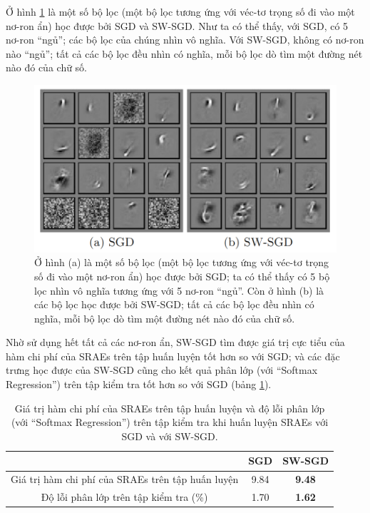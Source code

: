 Ở hình \ref{fig_filters} là một số bộ lọc (một bộ lọc tương ứng với véc-tơ trọng số đi vào một nơ-ron ẩn) học được bởi SGD và SW-SGD. Như ta có thể thấy, với SGD, có 5 nơ-ron ``ngủ''; các bộ lọc của chúng nhìn vô nghĩa. Với SW-SGD, không có nơ-ron nào ``ngủ''; tất cả các bộ lọc đều nhìn có nghĩa, mỗi bộ lọc dò tìm một đường nét nào đó của chữ số.
\begin{figure}
	\centering
	\includegraphics[width=\textwidth]{some_filters}
	\caption[So sánh giữa các bộ lọc học được bởi SGD với SW-SGD]{Ở hình (a) là một số bộ lọc (một bộ lọc tương ứng với véc-tơ trọng số đi vào một nơ-ron ẩn) học được bởi SGD; ta có thể thấy có 5 bộ lọc nhìn vô nghĩa tương ứng với 5 nơ-ron ``ngủ''. Còn ở hình (b) là các bộ lọc học được bởi SW-SGD; tất cả các bộ lọc đều nhìn có nghĩa, mỗi bộ lọc dò tìm một đường nét nào đó của chữ số.}
	\label{fig_filters}
\end{figure}

Nhờ sử dụng hết tất cả các nơ-ron ẩn, SW-SGD tìm được giá trị cực tiểu của hàm chi phí của SRAEs trên tập huấn luyện tốt hơn so với SGD; và các đặc trưng học được của SW-SGD cũng cho kết quả phân lớp (với ``Softmax Regression'') trên tập kiểm tra tốt hơn so với SGD (bảng \ref{table_SGDvsSW-SGD}).

\begin{table}
	\centering
	\caption[So sánh giữa SGD với SW-SGD]{Giá trị hàm chi phí của SRAEs trên tập huấn luyện và độ lỗi phân lớp (với ``Softmax Regression'') trên tập kiểm tra khi huấn luyện SRAEs với SGD và với SW-SGD.}
	\label{table_SGDvsSW-SGD}
	\begin{tabular}{|c|c|c|} \hline
	 & SGD & SW-SGD\\ \hline
	Giá trị hàm chi phí của SRAEs trên tập huấn luyện & 9.84 & \textbf{9.48}\\ \hline 
	Độ lỗi phân lớp trên tập kiểm tra (\%) & 1.70 & \textbf{1.62}\\ \hline
	\end{tabular}
\end{table}

